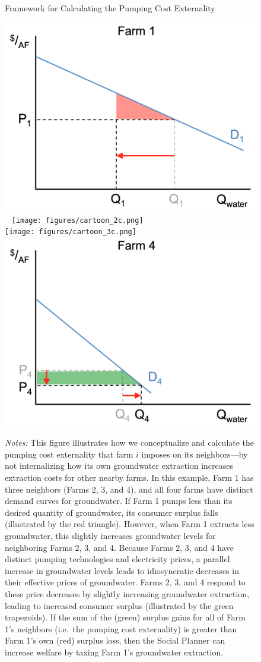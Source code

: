 
\begin{figure}[h!]\centering
\captionsetup{width=\textwidth}
\caption{Framework for Calculating the Pumping Cost Externality}
\label{fig:open_access_cartoons}
\vspace{-1mm}
{\includegraphics[width=.485\textwidth]{figures/cartoon_1c.png}}~
{\texttt{[image: figures/cartoon\_2c.png]}}\\
\vspace{3mm}
{\texttt{[image: figures/cartoon\_3c.png]}}~
{\includegraphics[width=.485\textwidth]{figures/cartoon_4c.png}}\\
\vspace{3mm}
\captionsetup{width=.\textwidth}
\caption*{\footnotesize \emph{Notes:} 
This figure illustrates how we conceptualize and calculate the pumping cost externality that farm $i$ imposes on its neighbors---by not internalizing how its own groundwater extraction increases extraction costs for other nearby farms. In this example, Farm 1 has three neighbors (Farms 2, 3, and 4), and all four farms have distinct demand curves for groundwater. If Farm 1 pumps less than its desired quantity of groundwater, its consumer surplus falls (illustrated by the red triangle). However, when Farm 1 extracts less groundwater, this slightly increases groundwater levels for neighboring Farms 2, 3, and 4. Because Farms 2, 3, and 4 have distinct pumping technologies and electricity prices, a parallel increase in groundwater levels leads to idiosyncratic decreases in their effective prices of groundwater. Farms 2, 3, and 4 respond to these price decreases by slightly increasing groundwater extraction, leading to increased consumer surplus (illustrated by the green trapezoids). If the sum of the (green)  surplus gains for all of Farm 1's neighbors (i.e.\ the pumping cost externality) is greater than Farm 1's own (red) surplus loss, then the Social Planner can increase welfare by taxing Farm 1's groundwater extraction.
 }
\end{figure}